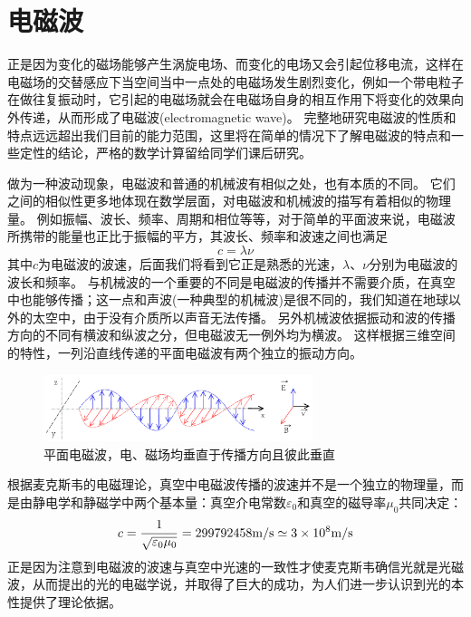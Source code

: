 \section{电磁波}

正是因为变化的磁场能够产生涡旋电场、而变化的电场又会引起位移电流，这样在电磁场的交替感应下当空间当中一点处的电磁场发生剧烈变化，例如一个带电粒子在做往复振动时，它引起的电磁场就会在电磁场自身的相互作用下将变化的效果向外传递，从而形成了{\heiti 电磁波}(electromagnetic wave)。
完整地研究电磁波的性质和特点远远超出我们目前的能力范围，这里将在简单的情况下了解电磁波的特点和一些定性的结论，严格的数学计算留给同学们课后研究。

做为一种波动现象，电磁波和普通的机械波有相似之处，也有本质的不同。
它们之间的相似性更多地体现在数学层面，对电磁波和机械波的描写有着相似的物理量。
例如振幅、波长、频率、周期和相位等等，对于简单的平面波来说，电磁波所携带的能量也正比于振幅的平方，其波长、频率和波速之间也满足
\begin{equation}
c = \lambda\nu
\end{equation}
其中$c$为电磁波的波速，后面我们将看到它正是熟悉的光速，$\lambda$、$\nu$分别为电磁波的波长和频率。
与机械波的一个重要的不同是电磁波的传播并不需要介质，在真空中也能够传播；这一点和声波(一种典型的机械波)是很不同的，我们知道在地球以外的太空中，由于没有介质所以声音无法传播。
另外机械波依据振动和波的传播方向的不同有横波和纵波之分，但电磁波无一例外均为横波。
这样根据三维空间的特性，一列沿直线传递的平面电磁波有两个独立的振动方向。

\begin{figure}[htb]
\centering
\includegraphics[width=0.7\textwidth]{images/em-theory-5.pdf}
\caption{平面电磁波，电、磁场均垂直于传播方向且彼此垂直}
\label{fig: em-theory-5}
\end{figure}

根据麦克斯韦的电磁理论，真空中电磁波传播的波速并不是一个独立的物理量，而是由静电学和静磁学中两个基本量：真空介电常数$\varepsilon_0$和真空的磁导率$\mu_0$共同决定：
\begin{equation}
c = \frac{1}{\sqrt{\varepsilon_0\mu_0}} = 299792458{\rm{m/s}} \simeq 3\times 10^{8}{\rm{m/s}}
\end{equation}
正是因为注意到电磁波的波速与真空中光速的一致性才使麦克斯韦确信光就是光磁波，从而提出的光的电磁学说，并取得了巨大的成功，为人们进一步认识到光的本性提供了理论依据。


